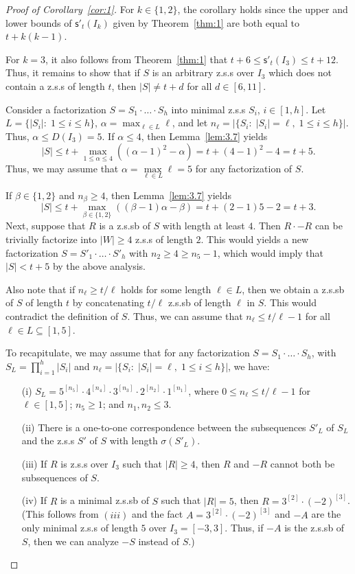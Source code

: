 \documentclass[12 pt]{amsart}
\def \zs{z.s.s }
\def \zsb{z.s.s{\tiny b} }
\def \m{\mathsf{s}'}
\begin{document}
\begin{proof}[Proof of Corollary~\ref{cor:1}]
For $k\in\{1,2\}$, the corollary holds since the upper and lower bounds of $\m_t(I_k)$ given by Theorem~\ref{thm:1} are both equal to $t+k(k-1)$. 

For $k=3$, it also follows from Theorem~\ref{thm:1} that 
$t+6\leq \m_t(I_3)\leq t+12$. Thus, it remains to show that if 
$S$ is an arbitrary \zs over $I_3$ which does not contain a \zs 
of length $t$, then $|S|\not=t+d$ for all $d\in[6,11]$. 

Consider a factorization $S=S_1\cdot\ldots\cdot S_h$ into minimal \zs $S_i$, $i\in[1,h]$. Let $L=\{|S_i|:\; 1\leq i\leq h\}$, $\alpha=\max_{\ell\in L}\ell$, and let $n_\ell=|\{S_i:\; |S_i|=\ell,\; 1\leq i\leq h\}|$. Thus,  $\alpha\leq D(I_3)=5$. If $\alpha\leq4$, then Lemma~\ref{lem:3.7} yields
\[|S|\leq  t+\max_{1\leq\alpha\leq 4}\left((\alpha-1)^2-\alpha\right)= t+(4-1)^2-4=t+5.\]
Thus, we may assume that $\alpha=\max\limits_{\ell\in L}\ell=5$ for any factorization of $S$.

If $\beta\in\{1,2\}$ and $n_\beta\geq 4$, then  Lemma~\ref{lem:3.7} yields
\[|S|\leq  t+\max_{\beta\in\{1,2\}}\left( (\beta-1)\alpha-\beta\right)= t+(2-1)5-2=t+3.\]
Next, suppose that $R$ is a \zsb of $S$ with length at least $4$.
Then $R\cdot -R$ can be trivially factorize into $|W|\geq 4$  \zs of length $2$. This would yields a new factorization $S=S'_1\cdot\ldots\cdot S'_h$ with $n_2\geq 4\geq n_5-1$,
which would imply that $|S|< t+5$ by the above analysis.

Also note that if $n_\ell\geq t/\ell$ holds for some length $\ell\in L$, then we obtain a 
\zsb of $S$ of length $t$ by concatenating $t/\ell$ \zsb of length $\ell$ in $S$. This would contradict the definition of $S$.  
Thus, we can assume that $n_\ell\leq t/\ell-1$ for all $\ell\in L\subseteq [1,5]$.

To recapitulate, we may assume that for any factorization $S=S_1\cdot\ldots\cdot S_h$, with $S_L=\prod_{i=1}^h |S_i|$ and $n_\ell=|\{S_i:\; |S_i|=\ell,\; 1\leq i\leq h\}|$, we have:  
\begin{enumerate}
\item[(i)] $S_L=5^{[n_5]}\cdot 4^{[n_4]}\cdot 3^{[n_3]}\cdot 2^{[n_2]}\cdot1^{[n_1]}$, where $0\leq n_\ell\leq t/\ell-1$ for $\ell\in[1,5]$; $n_5\geq 1$; and $n_1,n_2\leq 3$.
\item[(ii)] There is a one-to-one correspondence between 
the subsequences $S'_L$ of $S_L$ and the \zs $S'$ of $S$ with length 
$\sigma(S'_L)$. 
\item[(iii)]  If $R$ is \zs over $I_3$ such that $|R|\geq 4$, then $R$ and $-R$ cannot both be subsequences of $S$.
\item[(iv)] If $R$ is a minimal \zsb  of $S$ such that $|R|=5$,
then $R=3^{[2]}\cdot(-2)^{[3]}$. \\ 
(This follows from $(iii)$ and the fact $A=3^{[2]}\cdot(-2)^{[3]}$ and $-A$ are the only minimal \zs of length $5$ over $I_3=[-3,3]$. Thus, if $-A$ is the \zsb of $S$, then we can analyze $-S$ instead of $S$.)
\end{enumerate}
 

\end{proof}
\end{document}
